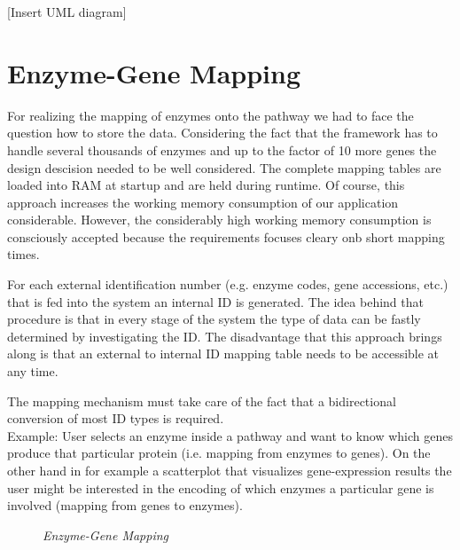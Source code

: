 [Insert UML diagram]


\section{Enzyme-Gene Mapping}

For realizing the mapping of enzymes onto the pathway we had to face the question how to store the data. Considering the fact that the framework has to handle several thousands of enzymes and up to the factor of 10 more genes the design descision needed to be well considered. The complete mapping tables are loaded into RAM at startup and are held during runtime. Of course, this approach increases the working memory consumption of our application considerable. However, the considerably high working memory consumption is consciously accepted because the requirements focuses cleary onb short mapping times.

For each external identification number (e.g. enzyme codes, gene accessions, etc.) that is fed into the system an internal ID is generated. The idea behind that procedure is that in every stage of the system the type of data can be fastly determined by investigating the ID. The disadvantage that this approach brings along is that an external to internal ID mapping table needs to be accessible at any time. 

The mapping mechanism must take care of the fact that a bidirectional conversion of most ID types is required.\\
Example: User selects an enzyme inside a pathway and want to know which genes produce that particular protein (i.e. mapping from enzymes to genes). On the other hand in for example a scatterplot that visualizes gene-expression results the user might be interested in the encoding of which enzymes a particular gene is involved (mapping from genes to enzymes).

\begin{figure}[ht]
\centering
{} 
\caption[Enzyme-Gene Mapping]{\textit{Enzyme-Gene Mapping}} 
\label{gfx:enzyme_gene_mapping}
\end{figure}

